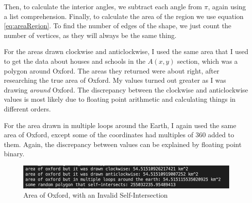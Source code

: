 \documentclass[12pt]{report}
\begin{document}
Then, to calculate the interior angles, we subtract each angle from $\pi$, again using a list comprehension. Finally, to calculate the area of the region we use equation \ref{eq:areaRegion}. To find the number of edges of the shape, we just count the number of vertices, as they will always be the same thing.

\begin{center}
\end{center}

For the areas drawn clockwise and anticlockwise, I used the same area that I used to get the data about houses and schools in the $A\left(x,y\right)$ section, which was a polygon around Oxford. The areas they returned were about right, after researching the true area of Oxford. My values turned out greater as I was drawing \textit{around} Oxford. The discrepancy between the clockwise and anticlockwise values is most likely due to floating point arithmetic and calculating things in different orders.

For the area drawn in multiple loops around the Earth, I again used the same area of Oxford, except some of the coordinates had multiples of 360 added to them. Again, the discrepancy between values can be explained by floating point binary.

\begin{figure}[H]
\centering
\includegraphics[width=14cm]{ss4.1.png}
\caption{Area of Oxford, with an Invalid Self-Intersection}\label{fig:ss4.1}
\end{figure}
\end{document}

